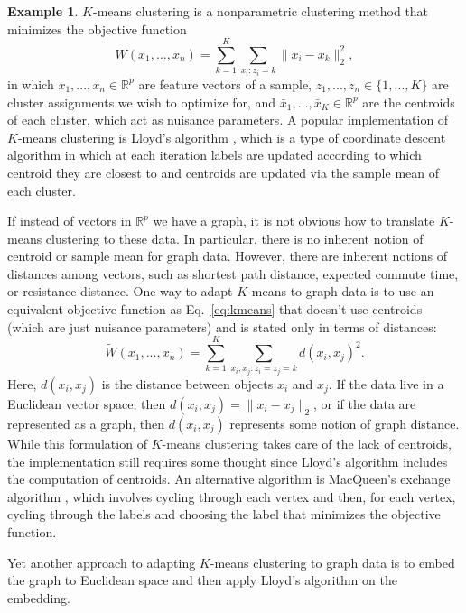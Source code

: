 \documentclass[
  11pt,
]{article}
\theoremstyle{definition}
\theoremstyle{definition}
\newtheorem{example}{Example}[section]
\theoremstyle{definition}
\theoremstyle{definition}
\theoremstyle{remark}
\begin{document}
\begin{example}
$K$-means clustering \citep{MacQueen1967} is a nonparametric clustering method that minimizes the objective function
\begin{equation}
\label{eq:kmeans}
W(x_1, ..., x_n) = \sum_{k = 1}^K \sum_{x_i : z_i = k} \|x_i - \bar{x}_k\|_2^2,
\end{equation}
in which $x_1, ..., x_n \in \mathbb{R}^p$ are feature vectors of a sample, $z_1, ..., z_n \in \{1, ..., K\}$ are cluster assignments we wish to optimize for, and $\bar{x}_1, ..., \bar{x}_K \in \mathbb{R}^p$ are the centroids of each cluster, which act as nuisance parameters. 
A popular implementation of $K$-means clustering is Lloyd's algorithm \citep{1056489}, which is a type of coordinate descent algorithm in which at each iteration labels are updated according to which centroid they are closest to and centroids are updated via the sample mean of each cluster. 

If instead of vectors in $\mathbb{R}^p$ we have a graph, it is not obvious how to translate $K$-means clustering to these data. 
In particular, there is no inherent notion of centroid or sample mean for graph data. 
However, there are inherent notions of distances among vectors, such as shortest path distance, expected commute time, or resistance distance. 
One way to adapt $K$-means to graph data is to use an equivalent objective function as Eq.~\ref{eq:kmeans} that doesn't use centroids (which are just nuisance parameters) and is stated only in terms of distances:  
$$
\tilde{W}(x_1, ..., x_n) = \sum_{k=1}^K \sum_{x_i, x_j : z_i = z_j = k} d(x_i, x_j)^2.
$$
Here, $d(x_i, x_j)$ is the distance between objects $x_i$ and $x_j$. 
If the data live in a Euclidean vector space, then $d(x_i, x_j) = \|x_i - x_j\|_2$, 
or if the data are represented as a graph, then $d(x_i, x_j)$ represents some notion of graph distance. 
While this formulation of $K$-means clustering takes care of the lack of centroids, the implementation still requires some thought since Lloyd's algorithm includes the computation of centroids. 
An alternative algorithm is MacQueen's exchange algorithm \citep{MacQueen1967}, which involves cycling through each vertex and then, for each vertex, cycling through the labels and choosing the label that minimizes the objective function. 

Yet another approach to adapting $K$-means clustering to graph data is to embed the graph to Euclidean space and then apply Lloyd's algorithm on the embedding. 
\end{example}
\end{document}
